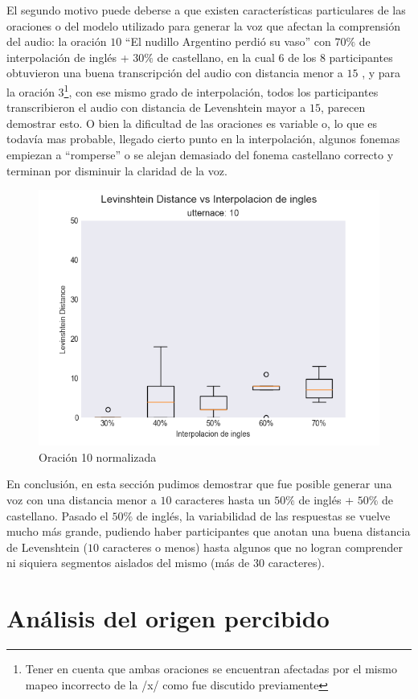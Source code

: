 El segundo motivo puede deberse a que existen características particulares de las oraciones o del modelo utilizado para generar la voz que afectan la comprensión del audio: la oración $10$ ``El nudillo Argentino perdió su vaso'' con $70\%$ de interpolación de inglés + $30\%$ de castellano, en la cual $6$ de los $8$ participantes obtuvieron una buena transcripción del audio con distancia menor a $15$ , y para la oración $3$\footnote{Tener en cuenta que ambas oraciones se encuentran afectadas por el mismo mapeo incorrecto de la /x/ como fue discutido previamente}, con ese mismo grado de interpolación, todos los participantes transcribieron el audio con distancia de Levenshtein mayor a $15$, parecen demostrar esto. O bien la dificultad de las oraciones es variable o, lo que es todavía mas probable, llegado cierto punto en la interpolación, algunos fonemas empiezan a ``romperse'' o se alejan demasiado del fonema castellano correcto y terminan por disminuir la claridad de la voz.

\begin{figure}
\begin{center}
\includegraphics[trim={0 0 0 1.25cm},clip,width=.5\textwidth]{imagenes/plots_normalized/10.png}
\end{center}
\caption{Oración 10 normalizada}
\label{pics:blablabla}
\end{figure}

En conclusión, en esta sección pudimos demostrar que fue posible generar una voz con una distancia menor a $10$ caracteres hasta un $50\%$ de inglés + $50\%$ de castellano. Pasado el $50\%$ de inglés, la variabilidad de las respuestas se vuelve mucho más grande, pudiendo haber participantes que anotan una buena distancia de Levenshtein ($10$ caracteres o menos) hasta algunos que no logran comprender ni siquiera segmentos aislados del mismo (más de $30$ caracteres).

\section{Análisis del origen percibido}


